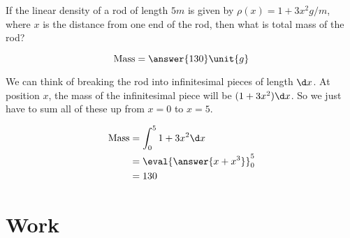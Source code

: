 \documentclass{ximera}
\begin{document}
\begin{question}
  If the linear density of a rod of length $5\unit{m}$ is given by
  $\rho(x) = 1+3x^2 \unit{g}/\unit{m}$, where $x$ is the distance from
  one end of the rod, then what is total mass of the rod?
  \begin{prompt}
    \[
    \mathrm{Mass} = \answer{130} \unit{g}
    \]
  \end{prompt}
  \begin{hint}
    We can think of breaking the rod into infinitesimal pieces of
    length $\d x$.  At position $x$, the mass of the infinitesimal
    piece will be $(1+3x^2)\d x$.  So we just have to sum all of these
    up from $x=0$ to $x=5$.
  \end{hint}
  \begin{hint}
    \begin{align*}
      \mathrm{Mass} &= \int_0^5 1+3x^2 \d x\\
      &=\eval{\answer{x+x^3}}_0^5\\
      &=130
    \end{align*}
  \end{hint}
\end{question}

\section{Work}
\end{document}
